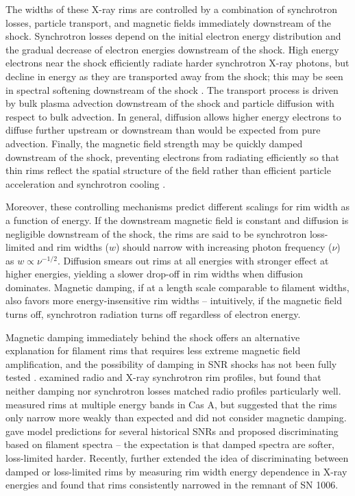 \documentclass[manuscript]{aastex}  %
\begin{document}
The widths of these X-ray rims are controlled by a combination of
synchrotron losses, particle transport, and magnetic fields immediately
downstream of the shock.  Synchrotron losses depend on the initial electron
energy distribution and the gradual decrease of electron energies downstream of
the shock.  High energy electrons near the shock efficiently radiate harder
synchrotron X-ray photons, but decline in energy as they are transported away
from the shock; this may be seen in spectral softening downstream of the shock
\citep[e.g.,][]{cassam-chenai2007}.  The transport process is driven by bulk
plasma advection downstream of the shock and particle diffusion with respect to
bulk advection.  In general, diffusion allows higher energy electrons to
diffuse further upstream or downstream than would be expected from pure
advection.  Finally, the magnetic field strength may be quickly damped
downstream of the shock, preventing electrons from radiating efficiently so
that thin rims reflect the spatial structure of the field rather than efficient
particle acceleration and synchrotron cooling \citep{pohl2005}.

Moreover, these controlling mechanisms predict different scalings for rim width
as a function of energy.  If the downstream magnetic field is constant and
diffusion is negligible downstream of the shock, the rims are said to be
synchrotron loss-limited and rim widths ($w$) should narrow with increasing
photon frequency ($\nu$) as $w \propto \nu^{-1/2}$. Diffusion smears out rims
at all energies with stronger effect at higher energies, yielding a slower
drop-off in rim widths when diffusion dominates.  Magnetic damping, if at a
length scale comparable to filament widths, also favors more energy-insensitive
rim widths -- intuitively, if the magnetic field turns off, synchrotron
radiation turns off regardless of electron energy.

Magnetic damping immediately behind the shock offers an alternative explanation
for filament rims that requires less extreme magnetic field amplification, and
the possibility of damping in SNR shocks has not been fully tested
\citep{pohl2005, marcowith2010}.  \citet{cassam-chenai2007} examined radio and
X-ray synchrotron rim profiles, but found that neither damping nor synchrotron
losses matched radio profiles particularly well.  \citet{araya2010} measured
rims at multiple energy bands in Cas A, but suggested that the rims only narrow
more weakly than expected and did not consider magnetic damping.
\citet{rettig2012} gave model predictions for several historical SNRs and
proposed discriminating based on filament spectra -- the expectation is that
damped spectra are softer, loss-limited harder.  Recently, \citet{ressler2014}
further extended the idea of discriminating between damped or loss-limited rims
by measuring rim width energy dependence in X-ray energies and found that rims
consistently narrowed in the remnant of SN 1006.
\end{document}
